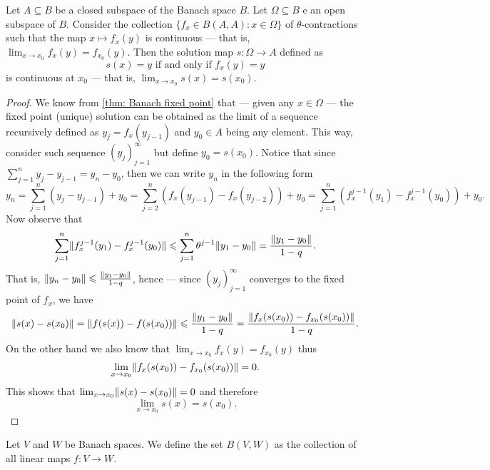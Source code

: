 \begin{proposition}
    \label{prop:fixed-point-stability}
    Let \(A \subseteq B\) be a closed subspace of the Banach space \(B\). Let \(\Omega \subseteq B\) e
    an open subspace of \(B\). Consider the collection \(\{f_{x} \in B(A, A) \colon x \in
    \Omega\}\)   of \(\theta\)-contractions such that the map \(x \mapsto f_x(y)\) is continuous ---
    that is, \(\lim_{x\to x_0} f_x(y) = f_{x_0}(y)\).
    Then the solution map \(s: \Omega \to A\) defined as
    \[
        s(x) = y \text{ if and only if } f_x(y) = y
    \]
    is continuous at \(x_0\) --- that is, \(\lim_{x \to x_0} s(x) = s(x_0)\).
\end{proposition}

\begin{proof}
    We know from \cref{thm: Banach fixed point} that --- given any \(x \in \Omega\) ---
    the fixed point (unique) solution can be obtained as the limit of
    a sequence recursively defined as \(y_j = f_x(y_{j-1})\) and \(y_0 \in A\) being
    any element. This way, consider such sequence \((y_j)_{j=1}^{\infty}\) but define
    \(y_0 = s(x_0)\). Notice that since \(\sum_{j=1}^n y_j - y_{j-1} = y_n - y_0\),
    then we can write \(y_n\) in the following form
    \[
        y_n = \sum_{j=1}^n (y_j - y_{j-1}) + y_0
        = \sum_{j=2}^n (f_x(y_{j-1}) - f_x(y_{j-2}))
        + y_0 = \sum_{j=1}^n \left(f_x^{j-1}(y_1) - f_x^{j-1}(y_0)\right) + y_{0}.
    \]
    Now observe that
    \[
        \sum_{j=1}^n \lVert f_x^{j-1}(y_1) - f_x^{j-1}(y_0)\rVert
        \leqslant \sum_{j=1}^n \theta^{j-1} \lVert y_1 -
            y_0\rVert = \frac{\lVert y_1 - y_0\rVert}{1 - q}.
    \]
    That is, \(\lVert y_n - y_0\rVert \leqslant \frac{\lVert y_1 - y_0\rVert}{1 - q}\), hence --- since
    \((y_j)_{j=1}^{\infty}\) converges to the fixed point of \(f_x\), we have
    \begin{align*}
        \lVert s(x) - s(x_0)\rVert = \lVert f(s(x)) - f(s(x_0))\rVert
        \leqslant \frac{\lVert y_1 - y_0\rVert}{1-q}
        = \frac{\lVert f_x(s(x_0)) - f_{x_0}(s(x_0))\rVert}{1 - q}.
    \end{align*}
    On the other hand we also know that \(\lim_{x \to x_0}f_x(y) = f_{x_0}(y)\) thus
    \[
        \lim_{x \to x_0} \lVert f_x(s(x_0)) - f_{x_0}(s(x_0))\rVert = 0.
    \]
    This shows that \(\lim_{x \to x_0} \lVert s(x) - s(x_0)\rVert = 0\) and therefore
    \[
        \lim_{x \to x_0} s(x) = s(x_0).
    \]
\end{proof}

\begin{definition}
    \label{def:banach-space-hom-set}
    Let \(V\) and \(W\) be Banach spaces. We define the set \(B(V, W)\) as the
    collection of all linear maps \(f: V \to W\).
\end{definition}

